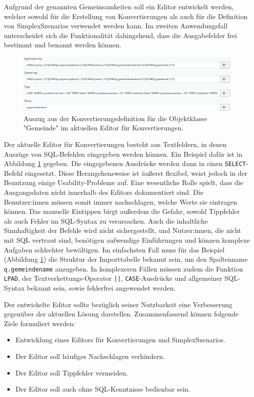 Aufgrund der genannten Gemeinsamkeiten soll ein Editor entwickelt werden, welcher sowohl für die Erstellung von Konvertierungen als auch für die Definition von SimplexSzenarios verwendet werden kann. Im zweiten Anwendungsfall unterscheidet sich die Funktionalität dahingehend, dass die Ausgabefelder frei bestimmt und benannt werden können.

\begin{figure}[ht]
  \centering
  \includegraphics[width=.95\textwidth]{assets/conversion-gemeinde.png}
  \caption{Auszug aus der Konvertierungsdefinition für die Objektklasse "Gemeinde" im aktuellen Editor für Konvertierungen.}
  \label{fig:conversion-gemeinde}
\end{figure}

Der aktuelle Editor für Konvertierungen besteht aus Textfeldern, in denen Auszüge von \ac{SQL}-Befehlen eingegeben werden können. Ein Beispiel dafür ist in Abbildung \ref{fig:conversion-gemeinde} gegeben. Die eingegebenen Ausdrücke werden dann in einen \texttt{SELECT}-Befehl eingesetzt. Diese Herangehensweise ist äußerst flexibel, weist jedoch in der Benutzung einige Usability-Probleme auf. Eine wesentliche Rolle spielt, dass die Ausgangsdaten nicht innerhalb des Editors dokumentiert sind. Die Benutzer:innen müssen somit immer nachschlagen, welche Werte sie eintragen können. Das manuelle Eintippen birgt außerdem die Gefahr, sowohl Tippfehler als auch Fehler im \ac{SQL}-Syntax zu verursachen. Auch die inhaltliche Sinnhaftigkeit der Befehle wird nicht sichergestellt, und Nutzer:innen, die nicht mit SQL vertraut sind, benötigen aufwendige Einführungen und können komplexe Aufgaben schlechter bewältigen. Im einfachsten Fall muss für das Beispiel (Abbildung \ref{fig:conversion-gemeinde}) die Struktur der Importtabelle bekannt sein, um den Spaltenname \texttt{q.gemeindename} anzugeben. In komplexeren Fällen müssen zudem die Funktion \texttt{LPAD}, der Textverkettungs-Operator \texttt{||}, \texttt{CASE}-Ausdrücke und allgemeiner \ac{SQL}-Syntax bekannt sein, sowie fehlerfrei angewendet werden.

\vspace{\baselineskip}

\noindent
Der entwickelte Editor sollte bezüglich seiner Nutzbarkeit eine Verbesserung gegenüber der aktuellen Lösung darstellen. Zusammenfassend können folgende Ziele formuliert werden:
\begin{itemize}
  \item Entwicklung eines Editors für Konvertierungen und SimplexSzenarios.
  \item Der Editor soll häufiges Nachschlagen verhindern.
  \item Der Editor soll Tippfehler vermeiden.
  \item Der Editor soll auch ohne \ac{SQL}-Kenntnisse bedienbar sein.
\end{itemize}
